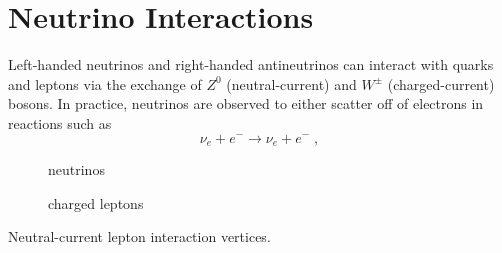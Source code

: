 \section{Neutrino Interactions}
\label{sec:ew-interactions}

Left-handed neutrinos and right-handed antineutrinos can interact with quarks and leptons via the exchange of $Z^0$ (neutral-current) and $W^\pm$ (charged-current) bosons.
In practice, neutrinos are observed to either scatter off of electrons in reactions such as
\begin{equation}
    \nu_e + e^- \rightarrow \nu_e + e^-\;,
\end{equation}
\begin{marginfigure}
\centering
\begin{subfigure}[t]{0.49\linewidth}
    \caption{neutrinos}
\end{subfigure}
\begin{subfigure}[t]{0.49\linewidth}
    \caption{charged leptons}
\end{subfigure}
\caption{Neutral-current lepton interaction vertices.}
\label{fig:nc-vertices}
\end{marginfigure}
